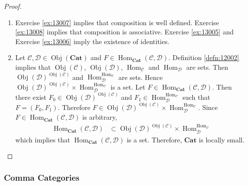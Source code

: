 \documentclass[12pt]{amsart}
\theoremstyle{definition}
\newcommand{\MC}{\mathcal{C}}
\newcommand{\MD}{\mathcal{D}}
\newcommand{\tbf}[1]{\textbf{#1}}
\DeclareMathOperator{\Obj}{Obj}
\DeclareMathOperator{\Hom}{Hom}
\DeclareMathOperator*{\0}{\mbf{0}}
\DeclareMathOperator*{\1}{\mbf{1}}
\newcommand{\rex}[1]{Exercise \ref{ex:#1}}
\newcommand{\rd}[1]{Definition \ref{defn:#1}}
\begin{document}
	\begin{proof}\
		\begin{enumerate}
			\item \rex{13007} implies that composition is well defined. \rex{13008} implies that composition is associative. \rex{13005} and \rex{13006} imply the existence of identities.
			\item Let $\MC, \MD \in \Obj(\tbf{Cat})$ and $F \in \Hom_{\tbf{Cat}}(\MC, \MD)$. \rd{12002} implies that $\Obj(\MC)$, $\Obj(\MD)$, $\Hom_{\MC}$ and $\Hom_{\MD}$ are sets. Then $\Obj(\MD)^{\Obj(\MC)}$ and $\Hom_{\MD}^{ \Hom_{\MC}}$ are sets. Hence $ \Obj(\MD)^{\Obj(\MC)} \times  \Hom_{\MD}^{ \Hom_{\MC}}$ is a set. Let $F \in \Hom_{\tbf{Cat}}(\MC, \MD)$. Then there exist $F_0 \in \Obj(\MD)^{\Obj(\MC)} $ and $F_1 \in \Hom_{\MD}^{ \Hom_{\MC}}$ such that $F = (F_0, F_1)$. Therefore $F \in  \Obj(\MD)^{\Obj(\MC)} \times  \Hom_{\MD}^{ \Hom_{\MC}}$. Since $F \in \Hom_{\tbf{Cat}}(\MC, \MD)$ is arbitrary, 
			\begin{align*}
				\Hom_{\tbf{Cat}}(\MC, \MD) 
				& \subset \Obj(\MD)^{\Obj(\MC)} \times  \Hom_{\MD}^{ \Hom_{\MC}}
			\end{align*}
			which implies that $\Hom_{\tbf{Cat}}(\MC, \MD)$ is a set. Therefore, $\tbf{Cat}$ is locally small.
		\end{enumerate} 
	\end{proof}















	\subsubsection{Comma Categories}
\end{document}
